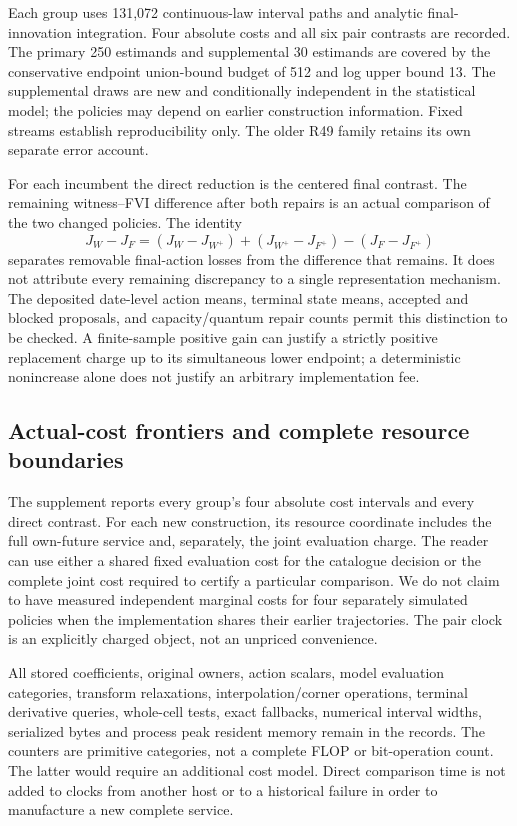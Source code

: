 Each group uses 131,072 continuous-law interval paths and analytic final-innovation integration. Four absolute costs and all six pair contrasts are recorded. The primary 250 estimands and supplemental 30 estimands are covered by the conservative endpoint union-bound budget of 512 and log upper bound 13. The supplemental draws are new and conditionally independent in the statistical model; the policies may depend on earlier construction information. Fixed streams establish reproducibility only. The older R49 family retains its own separate error account.




For each incumbent the direct reduction is the centered final contrast. The remaining witness--FVI difference after both repairs is an actual comparison of the two changed policies. The identity
\[
 J_W-J_F=(J_W-J_{W^+})+(J_{W^+}-J_{F^+})-(J_F-J_{F^+})
\]
separates removable final-action losses from the difference that remains. It does not attribute every remaining discrepancy to a single representation mechanism. The deposited date-level action means, terminal state means, accepted and blocked proposals, and capacity/quantum repair counts permit this distinction to be checked. A finite-sample positive gain can justify a strictly positive replacement charge up to its simultaneous lower endpoint; a deterministic nonincrease alone does not justify an arbitrary implementation fee.

\subsection{Actual-cost frontiers and complete resource boundaries}
The supplement reports every group's four absolute cost intervals and every direct contrast. For each new construction, its resource coordinate includes the full own-future service and, separately, the joint evaluation charge. The reader can use either a shared fixed evaluation cost for the catalogue decision or the complete joint cost required to certify a particular comparison. We do not claim to have measured independent marginal costs for four separately simulated policies when the implementation shares their earlier trajectories. The pair clock is an explicitly charged object, not an unpriced convenience.


All stored coefficients, original owners, action scalars, model evaluation categories, transform relaxations, interpolation/corner operations, terminal derivative queries, whole-cell tests, exact fallbacks, numerical interval widths, serialized bytes and process peak resident memory remain in the records. The counters are primitive categories, not a complete FLOP or bit-operation count. The latter would require an additional cost model. Direct comparison time is not added to clocks from another host or to a historical failure in order to manufacture a new complete service.

